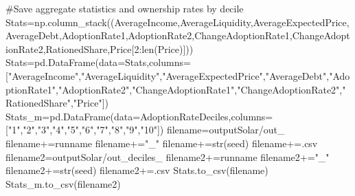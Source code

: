 \documentclass[
  letterpaper,
  DIV=11,
  numbers=noendperiod]{scrartcl}
\newenvironment{Shaded}{\begin{snugshade}}{\end{snugshade}}
\newcommand{\BuiltInTok}[1]{\textcolor[rgb]{0.00,0.23,0.31}{#1}}
\newcommand{\CommentTok}[1]{\textcolor[rgb]{0.37,0.37,0.37}{#1}}
\newcommand{\DecValTok}[1]{\textcolor[rgb]{0.68,0.00,0.00}{#1}}
\newcommand{\NormalTok}[1]{\textcolor[rgb]{0.00,0.23,0.31}{#1}}
\newcommand{\OperatorTok}[1]{\textcolor[rgb]{0.37,0.37,0.37}{#1}}
\newcommand{\StringTok}[1]{\textcolor[rgb]{0.13,0.47,0.30}{#1}}
\begin{document}
\begin{Shaded}
\begin{Highlighting}[]
    \CommentTok{\#Save aggregate statistics and ownership rates by decile}
\NormalTok{    Stats}\OperatorTok{=}\NormalTok{np.column\_stack((AverageIncome,AverageLiquidity,AverageExpectedPrice,AverageDebt,AdoptionRate1,AdoptionRate2,ChangeAdoptionRate1,ChangeAdoptionRate2,RationedShare,Price[}\DecValTok{2}\NormalTok{:}\BuiltInTok{len}\NormalTok{(Price)]))}
\NormalTok{    Stats}\OperatorTok{=}\NormalTok{pd.DataFrame(data}\OperatorTok{=}\NormalTok{Stats,columns}\OperatorTok{=}\NormalTok{[}\StringTok{"AverageIncome"}\NormalTok{,}\StringTok{"AverageLiquidity"}\NormalTok{,}\StringTok{"AverageExpectedPrice"}\NormalTok{,}\StringTok{"AverageDebt"}\NormalTok{,}\StringTok{"AdoptionRate1"}\NormalTok{,}\StringTok{"AdoptionRate2"}\NormalTok{,}\StringTok{"ChangeAdoptionRate1"}\NormalTok{,}\StringTok{"ChangeAdoptionRate2"}\NormalTok{,}\StringTok{"RationedShare"}\NormalTok{,}\StringTok{"Price"}\NormalTok{])}
\NormalTok{    Stats\_m}\OperatorTok{=}\NormalTok{pd.DataFrame(data}\OperatorTok{=}\NormalTok{AdoptionRateDeciles,columns}\OperatorTok{=}\NormalTok{[}\StringTok{"1"}\NormalTok{,}\StringTok{"2"}\NormalTok{,}\StringTok{"3"}\NormalTok{,}\StringTok{"4"}\NormalTok{,}\StringTok{"5"}\NormalTok{,}\StringTok{"6"}\NormalTok{,}\StringTok{"7"}\NormalTok{,}\StringTok{"8"}\NormalTok{,}\StringTok{"9"}\NormalTok{,}\StringTok{"10"}\NormalTok{])}
\NormalTok{    filename}\OperatorTok{=}\StringTok{\textquotesingle{}outputSolar/out\_\textquotesingle{}}
\NormalTok{    filename}\OperatorTok{+=}\NormalTok{runname}
\NormalTok{    filename}\OperatorTok{+=}\StringTok{"\_"}
\NormalTok{    filename}\OperatorTok{+=}\BuiltInTok{str}\NormalTok{(seed)}
\NormalTok{    filename}\OperatorTok{+=}\StringTok{\textquotesingle{}.csv\textquotesingle{}}
\NormalTok{    filename2}\OperatorTok{=}\StringTok{\textquotesingle{}outputSolar/out\_deciles\_\textquotesingle{}}
\NormalTok{    filename2}\OperatorTok{+=}\NormalTok{runname}
\NormalTok{    filename2}\OperatorTok{+=}\StringTok{"\_"}
\NormalTok{    filename2}\OperatorTok{+=}\BuiltInTok{str}\NormalTok{(seed)}
\NormalTok{    filename2}\OperatorTok{+=}\StringTok{\textquotesingle{}.csv\textquotesingle{}}
\NormalTok{    Stats.to\_csv(filename)}
\NormalTok{    Stats\_m.to\_csv(filename2)}
\end{Highlighting}
\end{Shaded}

\hypertarget{section}{%
\section{}\label{section}}
\end{document}

